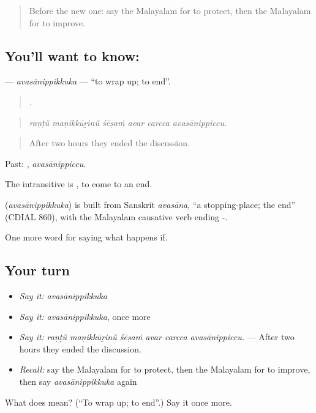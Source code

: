\label{lesson:ML-C450-avasanippikkuka}



\begin{quote}
Before the new one: say the Malayalam for to protect, then the Malayalam for to improve.
\end{quote}

\subsection*{You'll want to know: }
\textbf{} — \emph{avasānippikkuka} — \textquotedblleft{}to wrap up; to end\textquotedblright{}.

\begin{quote}
     .
\end{quote}

\begin{quote}
\emph{raṇṭŭ maṇikkūṟinŭ śēṣaṁ avar carcca avasānippiccu.}
\end{quote}

\begin{quote}
After two hours they ended the discussion.
\end{quote}

Past: , \emph{avasānippiccu}.

The intransitive is , to come to an end.

\begin{cousinweb}
\textbf{} (\emph{avasānippikkuka}) is built from Sanskrit \emph{avasāna}, \textquotedblleft{}a stopping-place; the end\textquotedblright{} (CDIAL 860), with the Malayalam causative verb ending -.
\end{cousinweb}

\begin{grammarlens}[title={What you've built}]
One more word for saying what happens if.
\end{grammarlens}

\subsection*{Your turn}
\begin{itemize}
\raggedright
  \item \emph{Say it:} \emph{avasānippikkuka}
  \item \emph{Say it:} \emph{avasānippikkuka}, once more
  \item \emph{Say it:} \emph{raṇṭŭ maṇikkūṟinŭ śēṣaṁ avar carcca avasānippiccu.} — After two hours they ended the discussion.
  \item \emph{Recall:} say the Malayalam for to protect, then the Malayalam for to improve, then say \emph{avasānippikkuka} again
\end{itemize}

\begin{tcolorbox}[breakable,colback=teal!4,colframe=teal!35!black,title={Before you move on}]
What does  mean? (\textquotedblleft{}To wrap up; to end\textquotedblright{}.) Say it once more.
\end{tcolorbox}
